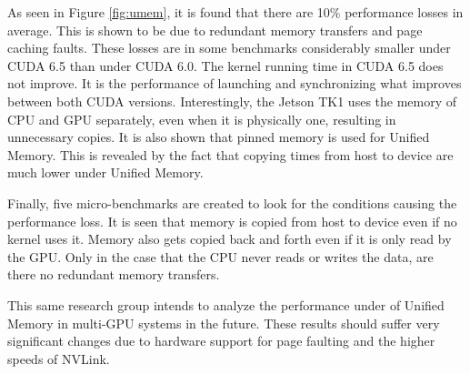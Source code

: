 As seen in Figure \ref{fig:umem}, it is found that there are 10\% performance losses in average.
This is shown to be due to redundant memory transfers and page caching faults.
These losses are in some benchmarks considerably smaller under CUDA 6.5 than under CUDA 6.0.
The kernel running time in CUDA 6.5 does not improve.
It is the performance of launching and synchronizing what improves between both CUDA versions.
Interestingly, the Jetson TK1 uses the memory of CPU and GPU separately, even when it is physically one, resulting in unnecessary copies.
It is also shown that pinned memory is used for Unified Memory.
This is revealed by the fact that copying times from host to device are much lower under Unified Memory.

Finally, five micro-benchmarks are created to look for the conditions causing the performance loss.
It is seen that memory is copied from host to device even if no kernel uses it.
Memory also gets copied back and forth even if it is only read by the GPU.
Only in the case that the CPU never reads or writes the data, are there no redundant memory transfers.

This same research group intends to analyze the performance under of Unified Memory in multi-GPU systems in the future.
These results should suffer very significant changes due to hardware support for page faulting and the higher speeds of NVLink.
